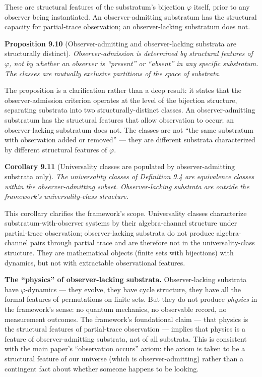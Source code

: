\documentclass[
]{article}
\begin{document}
These are structural features of the substratum's bijection \(\varphi\)
itself, prior to any observer being instantiated. An observer-admitting
substratum has the structural capacity for partial-trace observation; an
observer-lacking substratum does not.

\textbf{Proposition 9.10} (Observer-admitting and observer-lacking
substrata are structurally distinct). \emph{Observer-admission is
determined by structural features of \(\varphi\), not by whether an
observer is ``present'' or ``absent'' in any specific substratum. The
classes are mutually exclusive partitions of the space of substrata.}

The proposition is a clarification rather than a deep result: it states
that the observer-admission criterion operates at the level of the
bijection structure, separating substrata into two structurally-distinct
classes. An observer-admitting substratum has the structural features
that allow observation to occur; an observer-lacking substratum does
not. The classes are not ``the same substratum with observation added or
removed'' --- they are different substrata characterized by different
structural features of \(\varphi\).

\textbf{Corollary 9.11} (Universality classes are populated by
observer-admitting substrata only). \emph{The universality classes of
Definition 9.4 are equivalence classes within the observer-admitting
subset. Observer-lacking substrata are outside the framework's
universality-class structure.}

This corollary clarifies the framework's scope. Universality classes
characterize substratum-with-observer systems by their algebra-channel
structure under partial-trace observation; observer-lacking substrata do
not produce algebra-channel pairs through partial trace and are
therefore not in the universality-class structure. They are mathematical
objects (finite sets with bijections) with dynamics, but not with
extractable observational features.

\textbf{The ``physics'' of observer-lacking substrata.} Observer-lacking
substrata have \(\varphi\)-dynamics --- they evolve, they have cycle
structure, they have all the formal features of permutations on finite
sets. But they do not produce \emph{physics} in the framework's sense:
no quantum mechanics, no observable record, no measurement outcomes. The
framework's foundational claim --- that physics is the structural
features of partial-trace observation --- implies that physics is a
feature of observer-admitting substrata, not of all substrata. This is
consistent with the main paper's ``observation occurs'' axiom: the axiom
is taken to be a structural feature of our universe (which is
observer-admitting) rather than a contingent fact about whether someone
happens to be looking.
\end{document}
